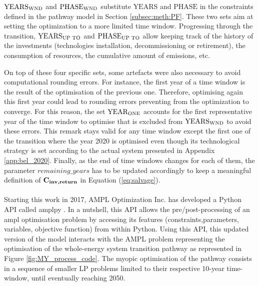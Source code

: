 $\text{YEARS}\textsubscript{WND}$ and $\text{PHASE}\textsubscript{WND}$ substitute $\text{YEARS}$ and $\text{PHASE}$ in the constraints defined in the pathway model in Section \ref{subsec:meth:PF}. These two sets aim at setting the optimization to a more limited time window. Progressing through the transition, $\text{YEARS}\textsubscript{UP TO}$ and $\text{PHASE}\textsubscript{UP TO}$ allow keeping track of the history of the investments (\eg technologies installation, decommissioning or retirement), the consumption of resources, the cumulative amount of emissions, etc.

On top of these four specific sets, some artefacts were also necessary to avoid computational rounding errors. For instance, the first year of a time window is the result of the optimisation of the previous one. Therefore, optimising again this first year could lead to rounding errors preventing from the optimization to converge. For this reason,  the set $\text{YEAR}\textsubscript{ONE}$ accounts for the first representative year of the time window to optimise that is excluded from $\text{YEARS}\textsubscript{WND}$ to avoid these errors. This remark stays valid for any time window except the first one of the transition where the year 2020 is optimised even though its technological strategy is set according to the actual system presented in Appendix \ref{app:bel_2020}. Finally, as the end of time windows changes for each of them, the parameter $remaining\_years$ has to be updated accordingly to keep a meaningful definition of $\textbf{C\textsubscript{inv,return}}$ in Equation (\ref{eq:salvage}).\\

\\

\noindent
Starting this work in 2017, AMPL Optimization Inc. has developed a Python \gls{API} called amplpy \cite{amplpy}. In a nutshell, this API allows the pre/post-processing of an ampl optimisation problem by accessing its features (\eg constraints,parameters, variables, objective function) from within Python. Using this \gls{API}, this updated version of the model interacts with the AMPL problem representing the optimisation of the whole-energy system transition pathway as represented in Figure \ref{fig:MY_process_code}. The myopic optimisation of the pathway consists in a sequence of smaller \gls{LP} problems limited to their respective 10-year time-window, until eventually reaching 2050.\\


